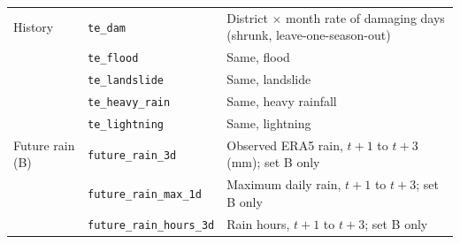 \begin{tabular}{p{0.9cm}p{3.0cm}p{3.55cm}}
History & \texttt{te\_dam} & District $\times$ month rate of damaging days (shrunk, leave-one-season-out) \\
 & \texttt{te\_flood} & Same, flood \\
 & \texttt{te\_landslide} & Same, landslide \\
 & \texttt{te\_heavy\_rain} & Same, heavy rainfall \\
 & \texttt{te\_lightning} & Same, lightning \\
Future rain (B) & \texttt{future\_rain\_3d} & Observed ERA5 rain, $t+1$ to $t+3$ (mm); set B only \\
 & \texttt{future\_rain\_max\_1d} & Maximum daily rain, $t+1$ to $t+3$; set B only \\
 & \texttt{future\_rain\_hours\_3d} & Rain hours, $t+1$ to $t+3$; set B only \\
\bottomrule
\end{tabular}
